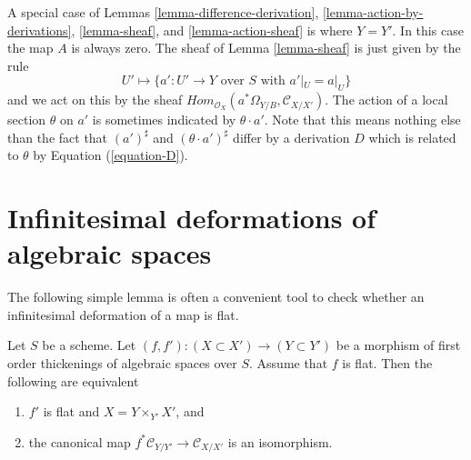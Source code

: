 \begin{remark}
\label{remark-special-case}
A special case of
Lemmas \ref{lemma-difference-derivation},
\ref{lemma-action-by-derivations},
\ref{lemma-sheaf}, and
\ref{lemma-action-sheaf}
is where $Y = Y'$. In this case the map $A$ is always zero.
The sheaf of
Lemma \ref{lemma-sheaf}
is just given by the rule
$$
U' \mapsto
\{a' : U' \to Y\text{ over }S\text{ with } a'|_U = a|_U\}
$$
and we act on this by the sheaf
$\textit{Hom}_{\mathcal{O}_X}(a^*\Omega_{Y/B}, \mathcal{C}_{X/X'})$.
The action of a local section $\theta$ on $a'$ is sometimes indicated by
$\theta \cdot a'$. Note that this means nothing else than the fact
that $(a')^\sharp$ and $(\theta \cdot a')^\sharp$ differ by a derivation
$D$ which is related to $\theta$ by Equation (\ref{equation-D}).
\end{remark}











\section{Infinitesimal deformations of algebraic spaces}
\label{section-deform}

\noindent
The following simple lemma is often a convenient tool to check whether
an infinitesimal deformation of a map is flat.

\begin{lemma}
\label{lemma-deform}
Let $S$ be a scheme. Let $(f, f') : (X \subset X') \to (Y \subset Y')$ be a
morphism of first order thickenings of algebraic spaces over $S$. Assume that
$f$ is flat. Then the following are equivalent
\begin{enumerate}
\item $f'$ is flat and $X = Y \times_{Y'} X'$, and
\item the canonical map $f^*\mathcal{C}_{Y/Y'} \to \mathcal{C}_{X/X'}$
is an isomorphism.
\end{enumerate}
\end{lemma}

